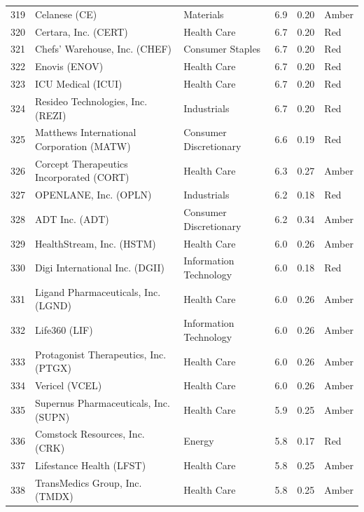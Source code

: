 \documentclass[11pt,a4paper]{article}
\begin{document}
{\begin{longtable}{r p{4.6cm} p{3cm} r r l}
319 & Celanese (CE) & Materials & 6.9 & 0.20 & \cellcolor[HTML]{FFEB9C}Amber \\
320 & Certara, Inc. (CERT) & Health Care & 6.7 & 0.20 & \cellcolor[HTML]{F4B6B6}Red \\
321 & Chefs' Warehouse, Inc. (CHEF) & Consumer Staples & 6.7 & 0.20 & \cellcolor[HTML]{F4B6B6}Red \\
322 & Enovis (ENOV) & Health Care & 6.7 & 0.20 & \cellcolor[HTML]{F4B6B6}Red \\
323 & ICU Medical (ICUI) & Health Care & 6.7 & 0.20 & \cellcolor[HTML]{F4B6B6}Red \\
324 & Resideo Technologies, Inc. (REZI) & Industrials & 6.7 & 0.20 & \cellcolor[HTML]{F4B6B6}Red \\
325 & Matthews International Corporation (MATW) & Consumer Discretionary & 6.6 & 0.19 & \cellcolor[HTML]{F4B6B6}Red \\
326 & Corcept Therapeutics Incorporated (CORT) & Health Care & 6.3 & 0.27 & \cellcolor[HTML]{FFEB9C}Amber \\
327 & OPENLANE, Inc. (OPLN) & Industrials & 6.2 & 0.18 & \cellcolor[HTML]{F4B6B6}Red \\
328 & ADT Inc. (ADT) & Consumer Discretionary & 6.2 & 0.34 & \cellcolor[HTML]{FFEB9C}Amber \\
329 & HealthStream, Inc. (HSTM) & Health Care & 6.0 & 0.26 & \cellcolor[HTML]{FFEB9C}Amber \\
330 & Digi International Inc. (DGII) & Information Technology & 6.0 & 0.18 & \cellcolor[HTML]{F4B6B6}Red \\
331 & Ligand Pharmaceuticals, Inc. (LGND) & Health Care & 6.0 & 0.26 & \cellcolor[HTML]{FFEB9C}Amber \\
332 & Life360 (LIF) & Information Technology & 6.0 & 0.26 & \cellcolor[HTML]{FFEB9C}Amber \\
333 & Protagonist Therapeutics, Inc. (PTGX) & Health Care & 6.0 & 0.26 & \cellcolor[HTML]{FFEB9C}Amber \\
334 & Vericel (VCEL) & Health Care & 6.0 & 0.26 & \cellcolor[HTML]{FFEB9C}Amber \\
335 & Supernus Pharmaceuticals, Inc. (SUPN) & Health Care & 5.9 & 0.25 & \cellcolor[HTML]{FFEB9C}Amber \\
336 & Comstock Resources, Inc. (CRK) & Energy & 5.8 & 0.17 & \cellcolor[HTML]{F4B6B6}Red \\
337 & Lifestance Health (LFST) & Health Care & 5.8 & 0.25 & \cellcolor[HTML]{FFEB9C}Amber \\
338 & TransMedics Group, Inc. (TMDX) & Health Care & 5.8 & 0.25 & \cellcolor[HTML]{FFEB9C}Amber \\

\end{longtable}}
\end{document}
